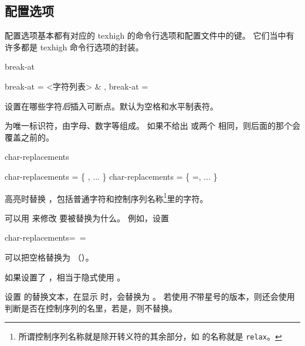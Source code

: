 \documentclass[class=article,openany]{cusdoc}[2025/09/29]
\begin{document}
\subsection{配置选项}

配置选项基本都有对应的 texhigh 的命令行选项和配置文件中的键。
它们当中有许多都是 texhigh 命令行选项的封装。

\begin{keyval}[path=high]{break-at}
  \begin{syntax}
    break-at = <{字符列表}> & \V{\\\ }, 
    break-at =  
  \end{syntax}
设置在哪些字符\emph{后}插入可断点。默认为空格和水平制表符。

 为唯一标识符，由字母、数字等组成。
如果不给出  或两个  相同，则后面的那个会覆盖之前的。
\end{keyval}

\begin{keyval}[path=high]{char-replacements}
  \begin{syntax}
    char-replacements = \V\{ , ... \V\}
    char-replacements = \V\{ =, ... \V\}
  \end{syntax}
高亮时替换 ，包括普通字符和控制序列名称\footnote{所谓控制序列名称就是除开转义符的其余部分，如  的名称就是 \texttt{relax}。}里的字符。

可以用  来修改  要被替换为什么。
例如，设置
\begin{thverbatim}
  char-replacements={\ =\textvisiblespace}
\end{thverbatim}
可以把空格替换为 \texttt{\textvisiblespace}（）。

如果设置了 ，相当于隐式使用 。
\end{keyval}

\begin{function}{\THSetCharReplacement}
  \begin{syntax}
    \V\THSetCharReplacement   {} 
    \V\THSetCharReplacement *  
  \end{syntax}
设置  的替换文本，在显示  时，会替换为 。
若使用\emph{不}带星号的版本，则还会使用  判断是否在控制序列的名里，若是，则不替换。
\end{function}
\end{document}
